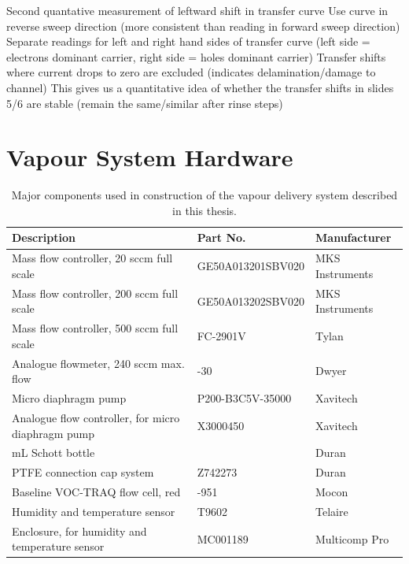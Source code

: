\documentclass[
  a4paper,
]{scrbook}
\begin{document}
Second quantative measurement of leftward shift in transfer curve Use
curve in reverse sweep direction (more consistent than reading in
forward sweep direction) Separate readings for left and right hand sides
of transfer curve (left side = electrons dominant carrier, right side =
holes dominant carrier) Transfer shifts where current drops to zero are
excluded (indicates delamination/damage to channel) This gives us a
quantitative idea of whether the transfer shifts in slides 5/6 are
stable (remain the same/similar after rinse steps)

\cleardoublepage
{}
{}
\appendix

\hypertarget{sec-vapour-sensor-components}{%
\chapter{Vapour System Hardware}\label{sec-vapour-sensor-components}}

\hypertarget{tbl-vapour-sensor-components}{}
\begin{longtable}[t]{>{\raggedright\arraybackslash}p{5.5cm}>{\raggedright\arraybackslash}p{4.5cm}>{\raggedright\arraybackslash}p{3.75cm}}
\caption{\label{tbl-vapour-sensor-components}Major components used in construction of the vapour delivery system
described in this thesis. }\tabularnewline

\toprule
Description & Part No. & Manufacturer\\
\midrule
Mass flow controller, 20 sccm full scale & GE50A013201SBV020 & MKS Instruments\\
Mass flow controller, 200 sccm full scale & GE50A013202SBV020 & MKS Instruments\\
Mass flow controller, 500 sccm full scale & FC-2901V & Tylan\\
Analogue flowmeter, 240 sccm max. flow & 116261-30 & Dwyer\\
Micro diaphragm pump & P200-B3C5V-35000 & Xavitech\\
\addlinespace
Analogue flow controller, for micro diaphragm pump & X3000450 & Xavitech\\
10 mL Schott bottle & 218010802 & Duran\\
PTFE connection cap system & Z742273 & Duran\\
Baseline VOC-TRAQ flow cell, red & 043-951 & Mocon\\
Humidity and temperature sensor & T9602 & Telaire\\
\addlinespace
Enclosure, for humidity and temperature sensor & MC001189 & Multicomp Pro\\
\bottomrule
\end{longtable}
\end{document}
